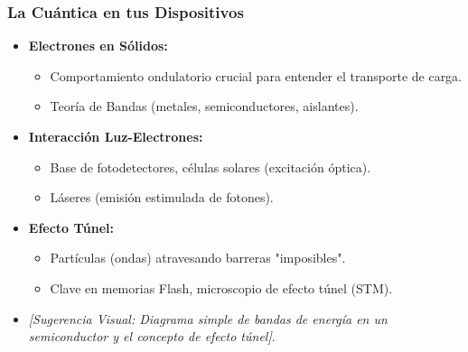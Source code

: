 \documentclass{beamer}
\begin{document}
	\begin{frame}
		\frametitle{La Cuántica en tus Dispositivos}
		\begin{itemize}
			\item \textbf{Electrones en Sólidos:}
			\begin{itemize}
				\item Comportamiento ondulatorio crucial para entender el transporte de carga.
				\item Teoría de Bandas (metales, semiconductores, aislantes).
			\end{itemize} \pause
			\item \textbf{Interacción Luz-Electrones:}
			\begin{itemize}
				\item Base de fotodetectores, células solares (excitación óptica).
				\item Láseres (emisión estimulada de fotones).
			\end{itemize} \pause
			\item \textbf{Efecto Túnel:}
			\begin{itemize}
				\item Partículas (ondas) atravesando barreras "imposibles".
				\item Clave en memorias Flash, microscopio de efecto túnel (STM).
			\end{itemize} \pause
			\item \textit{[Sugerencia Visual: Diagrama simple de bandas de energía en un semiconductor y el concepto de efecto túnel]}.
		\end{itemize}
	\end{frame}
	
\end{document}
